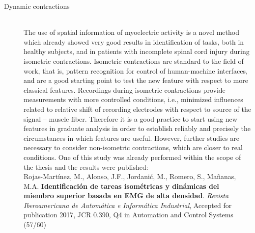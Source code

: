 \begin{description}
\item[Dynamic contractions] \hfill \\ 
	The use of spatial information of myoelectric activity is a novel method which already showed very good results in identification of tasks, both in healthy subjects, and in patients with incomplete spinal cord injury during isometric contractions. Isometric contractions are standard to the field of work, that is, pattern recognition for control of human-machine interfaces, and are a good starting point to test the new feature with respect to more classical features. Recordings during isometric contractions provide measurements with more controlled conditions, i.e., minimized influences related to relative shift of recording electrodes with respect to source of the signal – muscle fiber. Therefore it is a good practice to start using new features in graduate analysis in order to establish reliably and precisely the circumstances in which features are useful. However, further studies are necessary to consider non-isometric contractions, which are closer to real conditions. One of this study was already performed within the scope of the thesis and the results were published:\\
	\small{Rojas-Martínez, M., Alonso, J.F., Jordanić, M., Romero, S., Mañanas, M.A. \textbf{Identificación de tareas isométricas y dinámicas del miembro superior basada en EMG de alta densidad}. \textit{Revista Iberoamericana de Automática e Informática Industrial}, Accepted for publication 2017, JCR 0.390, Q4 in Automation and Control Systems (57/60)}
	
	
	


\end{description}
